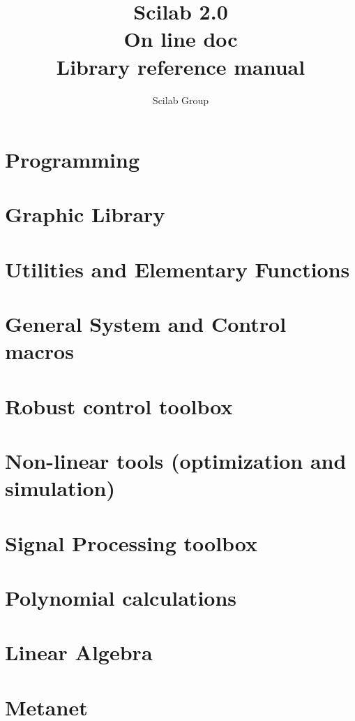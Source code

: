 
             \title{\Huge\bf Scilab 2.0 \\ On line doc \\ Library reference manual}
             \author{\huge Scilab Group}
             \textheight=660pt 
             \textwidth=470pt
             \topmargin=-27pt 
             \oddsidemargin=-1.2cm
             \evensidemargin=0.7cm
             \marginparwidth=60pt
\def\vector#1{\left( \begin{array}{c} #1  \end{array}\right)}
\def\matrixq#1{\left( \begin{array}{cc} #1  \end{array}\right)}

\makeindex 


\maketitle


\chapter{Programming}
	 
\chapter{Graphic Library }
	 
\chapter{Utilities and Elementary Functions}
	 
\chapter{General System and Control macros}
	 
\chapter{Robust control toolbox}
	 
\chapter{Non-linear tools (optimization and simulation) }
	 
\chapter{Signal Processing toolbox}
	 
\chapter{Polynomial calculations}
	
\chapter{Linear Algebra}
	
\chapter{Metanet}
	

\printindex

